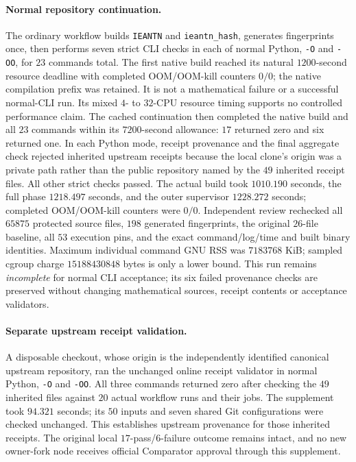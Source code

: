 \documentclass[11pt]{article}
\begin{document}
\paragraph{Normal repository continuation.}
The ordinary workflow builds \texttt{IEANTN} and \texttt{ieantn\_hash},
generates fingerprints once, then performs seven strict CLI checks in each
of normal Python, \texttt{-O} and \texttt{-OO}, for \(23\) commands total.
The first native build reached its natural \(1200\)-second resource deadline
with completed OOM/OOM-kill counters \(0/0\); the native compilation prefix
was retained. It is not a mathematical failure or a successful normal-CLI
run. Its mixed \(4\)- to \(32\)-CPU resource timing supports no controlled
performance claim. The cached continuation then completed the native build and all \(23\)
commands within its \(7200\)-second allowance: \(17\) returned zero and six
returned one. In each Python mode, receipt provenance and the final aggregate
check rejected inherited upstream receipts because the local clone's origin
was a private path rather than the public repository named by the \(49\)
inherited receipt files.
All other strict checks passed. The actual build took \(1010.190\) seconds,
the full phase \(1218.497\) seconds, and the outer supervisor \(1228.272\)
seconds; completed OOM/OOM-kill counters were \(0/0\). Independent review
rechecked all \(65875\) protected source files, \(198\) generated fingerprints,
the original \(26\)-file baseline, all \(53\) execution pins, and the exact
command/log/time and built binary identities. Maximum individual command
GNU RSS was \(7183768\) KiB; sampled cgroup charge \(15188430848\) bytes is
only a lower bound. This run remains \emph{incomplete} for normal CLI acceptance;
its six failed provenance checks are preserved without changing mathematical
sources, receipt contents or acceptance validators.

\paragraph{Separate upstream receipt validation.}
A disposable checkout, whose origin is the independently identified canonical
upstream repository, ran the unchanged online receipt validator in normal
Python, \texttt{-O} and \texttt{-OO}. All three commands returned zero after
checking the \(49\) inherited files against \(20\) actual workflow runs and
their jobs. The supplement took \(94.321\) seconds; its \(50\) inputs and
seven shared Git configurations were checked unchanged. This establishes
upstream provenance for those inherited receipts. The original local
\(17\)-pass/\(6\)-failure outcome remains intact, and no new owner-fork
node receives official Comparator approval through this supplement.
\end{document}
